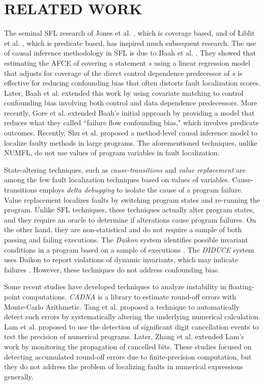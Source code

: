 \documentclass[times]{stvrauth}
\begin{document}
\section{RELATED WORK}\label{relatedwork}
The seminal SFL research of Jones et al. \cite{Jones2002}, which is coverage based, and of Liblit et al. \cite{Liblit2005}, which is predicate based, has inspired much subsequent research.  The use of causal inference methodology in SFL is due to Baah et al. \cite{Baah2010}.  They showed that estimating the AFCE of covering a statement $s$ using a linear regression model that adjusts for coverage of the direct control dependence predecessor of $s$ is effective for reducing confounding bias that often distorts fault localization scores.  Later, Baah et al. \cite{Baah2011} extended this work by using covariate matching to control confounding bias involving both control and data dependence predecessors.  More recently, Gore et al. \cite{Gore2012} extended Baah's initial approach by providing a model that reduces what they called ``failure flow confounding bias," which involves predicate outcomes.  Recently, Shu et al. \cite{Shu2013} proposed a method-level causal inference model to localize faulty methods in large programs. The aforementioned techniques, unlike NUMFL, do not use values of program variables in fault localization.

State-altering techniques, such as {\it cause-transitions} \cite{Cleve2005} and {\it value replacement} \cite{Jeffrey2008} are among the few fault localization techniques based on values of variables.  Cause-transitions employs {\it delta debugging} \cite{Zeller2002} to isolate the cause of a program failure. Value replacement localizes faults by switching program states and re-running the program. Unlike SFL techniques, these techniques actually alter program states, and they require an oracle to determine if alterations cause program failures. On the other hand, they are non-statistical and do not require a sample of both passing and failing executions. The {\it Daikon} system identifies possible invariant conditions in a program based on a sample of executions \cite{Ernst2007}. The {\it DIDUCE} system uses Daikon to report violations of dynamic invariants, which may indicate failures \cite{Hangal2002}. However, these techniques do not address confounding bias.


Some recent studies have developed techniques to analyze instability in floating-point computations. {\it CADNA} \cite{Scott2007} is a library to estimate round-off errors with Monte-Carlo Arithmetic. Tang et al. \cite{Tang2010} proposed a technique to automatically detect such errors by systematically altering the underlying numerical calculation. Lam et al. \cite{Lam2013} proposed to use the detection of significant digit cancellation events to test the precision of numerical programs.  Later, Zhang et al. \cite{Bao2013} extended Lam's work by monitoring the propagation of cancelled bits.  These studies focused on detecting accumulated round-off errors due to finite-precision computation, but they do not address the problem of localizing faults in numerical expressions generally.
\end{document}
